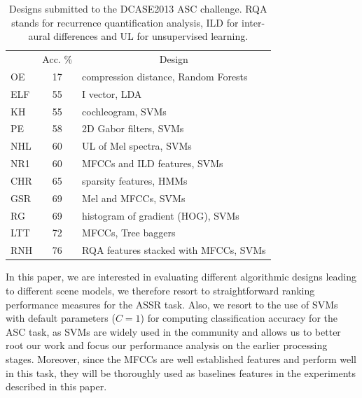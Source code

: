 \documentclass[journal]{IEEEtran}
\newcommand{\gl}[1]{\textcolor{red}{Gr\'egoire : #1}}
\begin{document}
\begin{table}
\begin{center}
\caption{Designs submitted to the DCASE2013 ASC challenge. RQA stands for recurrence quantification analysis, ILD for inter-aural differences and UL for unsupervised learning.  \label{tab:dcase}}
\begin{tabular}{lcl}
& Acc. \%  &  \multicolumn{1}{c}{Design}  \\
\cite{olivetti2013wonder} OE & 17 & compression distance, Random Forests \\
\cite{elizalde2013vector} ELF & 55 & I vector, LDA \\
\cite{krijnders2013tone} KH & 55 & cochleogram, SVMs \\
\cite{patil2013multiresolution} PE & 58 & 2D Gabor filters, SVMs \\
\cite{lee2013acoustic} NHL & 60 & UL of Mel spectra, SVMs \\
\cite{nogueira2013sound} NR1 & 60 & MFCCs and ILD features, SVMs \\
\cite{chum2013ieee} CHR & 65 & sparsity features, HMMs  \\
\cite{geiger2013large} GSR & 69 & Mel and MFCCs, SVMs \\
\cite{rakotomamonjy2015histogram} RG & 69  & histogram of gradient (HOG), SVMs \\
\cite{li2013auditory} LTT & 72 & MFCCs, Tree baggers \\
\cite{roma2013recurrence} RNH & 76 & RQA features stacked with MFCCs, SVMs \\
\end{tabular}
\end{center}
\end{table}



In this paper, we are interested in evaluating different algorithmic designs leading to different scene models, we therefore resort to straightforward ranking performance measures for the ASSR task. Also, we resort to the use of SVMs with default parameters ($C=1$) for computing classification accuracy for the ASC task, as SVMs are widely used in the community and allows us to better root our work and focus our performance analysis on the earlier processing stages. Moreover, since the MFCCs are well established features and perform well in this task, they will be thoroughly used as baselines features in the experiments described in this paper.

 
\end{document}
